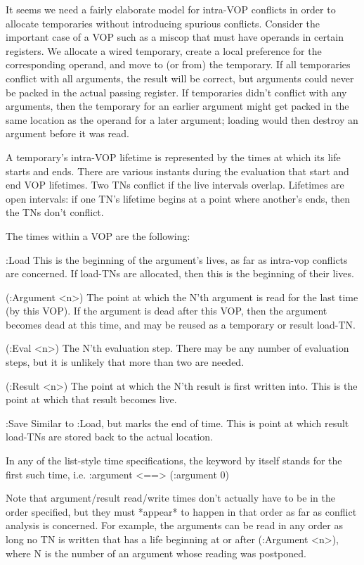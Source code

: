 It seems we need a fairly elaborate model for intra-VOP conflicts in order to
allocate temporaries without introducing spurious conflicts.  Consider the
important case of a VOP such as a miscop that must have operands in certain
registers.  We allocate a wired temporary, create a local preference for the
corresponding operand, and move to (or from) the temporary.  If all temporaries
conflict with all arguments, the result will be correct, but arguments could
never be packed in the actual passing register.  If temporaries didn't conflict
with any arguments, then the temporary for an earlier argument might get packed
in the same location as the operand for a later argument; loading would then
destroy an argument before it was read.

A temporary's intra-VOP lifetime is represented by the times at which its life
starts and ends.  There are various instants during the evaluation that start
and end VOP lifetimes.  Two TNs conflict if the live intervals overlap.
Lifetimes are open intervals: if one TN's lifetime begins at a point where
another's ends, then the TNs don't conflict.

The times within a VOP are the following:

:Load
    This is the beginning of the argument's lives, as far as intra-vop
    conflicts are concerned.  If load-TNs are allocated, then this is the
    beginning of their lives.

(:Argument <n>)
    The point at which the N'th argument is read for the last time (by this
    VOP).  If the argument is dead after this VOP, then the argument becomes
    dead at this time, and may be reused as a temporary or result load-TN.

(:Eval <n>)
    The N'th evaluation step.  There may be any number of evaluation steps, but
    it is unlikely that more than two are needed.

(:Result <n>) 
    The point at which the N'th result is first written into.  This is the
    point at which that result becomes live.

:Save
    Similar to :Load, but marks the end of time.  This is point at which result
    load-TNs are stored back to the actual location.

In any of the list-style time specifications, the keyword by itself stands for
the first such time, i.e.
    :argument  <==>  (:argument 0)


Note that argument/result read/write times don't actually have to be in the
order specified, but they must *appear* to happen in that order as far as
conflict analysis is concerned.  For example, the arguments can be read in any
order as long no TN is written that has a life beginning at or after
(:Argument <n>), where N is the number of an argument whose reading was
postponed.

